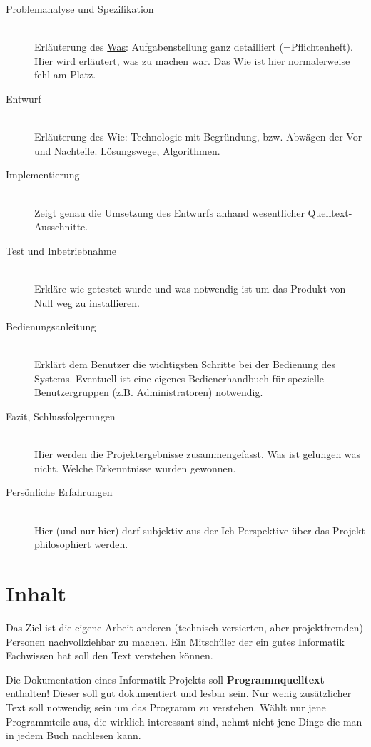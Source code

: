 \begin{description}
\item[Problemanalyse und Spezifikation]
\ \\Erläuterung des \underline{Was}: Aufgabenstellung ganz detailliert (=Pflichtenheft). Hier wird erläutert, was zu machen war. Das Wie ist hier normalerweise fehl am Platz.
\item[Entwurf]
\ \\Erläuterung des Wie: Technologie mit Begründung, bzw. Abwägen der Vor- und Nachteile. Lösungswege, Algorithmen.
\item[Implementierung]
\ \\Zeigt genau die Umsetzung des Entwurfs anhand wesentlicher Quelltext-Ausschnitte.
\item[Test und Inbetriebnahme]
\ \\Erkläre wie getestet wurde und was notwendig ist um das Produkt von Null weg zu installieren.
\item[Bedienungsanleitung]
\ \\Erklärt dem Benutzer die wichtigsten Schritte bei der Bedienung des Systems.
Eventuell ist eine eigenes Bedienerhandbuch für spezielle Benutzergruppen (z.B. Administratoren) notwendig.
\item[Fazit, Schlussfolgerungen]
\ \\Hier werden die Projektergebnisse zusammengefasst. Was ist gelungen was nicht. Welche Erkenntnisse wurden gewonnen.
\item[Persönliche Erfahrungen]
\ \\Hier (und nur hier) darf subjektiv aus der Ich Perspektive über das Projekt philosophiert werden.
\end{description}


\section{Inhalt}

Das Ziel ist die eigene Arbeit anderen (technisch versierten, aber projektfremden) Personen nachvollziehbar zu machen.
Ein Mitschüler der ein gutes Informatik Fachwissen hat soll den Text verstehen können.

Die Dokumentation eines Informatik-Projekts soll \textbf{Programmquelltext} enthalten!
Dieser soll gut dokumentiert und lesbar sein. 
Nur wenig zusätzlicher Text soll notwendig sein um das Programm zu verstehen.
Wählt nur jene Programmteile aus, die wirklich interessant sind, nehmt nicht jene Dinge die man in jedem Buch nachlesen kann.

